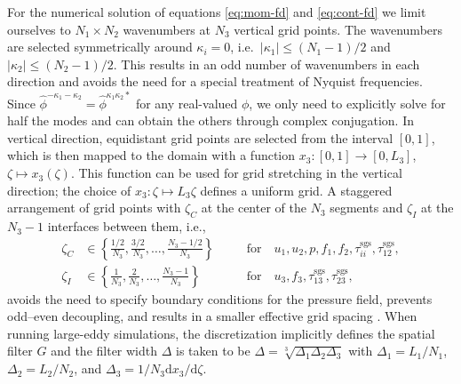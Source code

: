 \documentclass[gmd, manuscript]{copernicus}
\begin{document}
For the numerical solution of equations \eqref{eq:mom-fd} and \eqref{eq:cont-fd} we limit ourselves to \(N_1 \times N_2\) wavenumbers at \(N_3\) vertical grid points.
The wavenumbers are selected symmetrically around \(\kappa_i = 0\), i.e.~\(\lvert \kappa_1 \rvert \le (N_1-1)/2\) and \(\lvert \kappa_2 \rvert \le (N_2-1)/2\).
This results in an odd number of wavenumbers in each direction and avoids the need for a special treatment of Nyquist frequencies.
Since \(\hat{\phi}^{-\kappa_1-\kappa_2} = \hat{\phi}^{\kappa_1\kappa_2\ast}\) for any real-valued \(\phi\), we only need to explicitly solve for half the modes and can obtain the others through complex conjugation.
In vertical direction, equidistant grid points are selected from the interval \([0, 1]\), which is then mapped to the domain with a function \(x_3: \left[0, 1\right] \to \left[0, L_3\right]\), \(\zeta \mapsto x_3(\zeta)\).
This function can be used for grid stretching in the vertical direction; the choice of \(x_3: \zeta \mapsto L_3 \zeta\) defines a uniform grid.
A staggered arrangement of grid points with \(\zeta_C\) at the center of the \(N_3\) segments and \(\zeta_I\) at the \(N_3-1\) interfaces between them, i.e.,
\begin{equation}
  \begin{aligned}
  \zeta_C &\in \left\{ \frac{1/2}{N_3}, \frac{3/2}{N_3}, \dots, \frac{N_3-1/2}{N_3} \right\}
  && \quad \text{for} \quad u_1, u_2, p, f_1, f_2, \tau_{ii}^\mathrm{sgs}, \tau_{12}^\mathrm{sgs},
  \\
  \zeta_I &\in \left\{ \frac{1}{N_3}, \frac{2}{N_3}, \dots, \frac{N_3-1}{N_3} \right\}
  && \quad \text{for} \quad u_3, f_3, \tau_{13}^\mathrm{sgs}, \tau_{23}^\mathrm{sgs},
  \end{aligned}
\end{equation}
avoids the need to specify boundary conditions for the pressure field, prevents odd--even decoupling, and results in a smaller effective grid spacing \citep{FerzigerPericStreet2020}.
When running large-eddy simulations, the discretization implicitly defines the spatial filter \(G\) and the filter width \(\Delta\) is taken to be \(\Delta = \sqrt[3]{\Delta_1\Delta_2\Delta_3}\) \citep{ScottiMeneveauLilly1993} with \(\Delta_1 = L_1 / N_1\), \(\Delta_2 = L_2 / N_2\), and \(\Delta_3 = 1 / N_3 \mathrm{d}x_3 / \mathrm{d}\zeta\).
\end{document}
